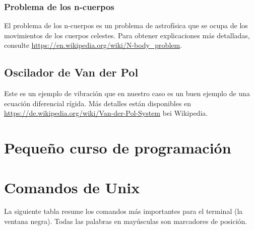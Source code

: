 \subsubsection{Problema de los n-cuerpos }
El problema de los n-cuerpos es un problema de astrofísica que se ocupa de los movimientos de los cuerpos celestes. Para obtener explicaciones más detalladas, consulte \url{https://en.wikipedia.org/wiki/N-body_problem}.

\subsection{Oscilador de Van der Pol }
Este es un ejemplo de vibración que en nuestro caso es un buen ejemplo de una ecuación diferencial rígida. Más detalles están disponibles en \url{https://de.wikipedia.org/wiki/Van-der-Pol-System} bei Wikipedia.




\begin{appendices}

\section{Pequeño curso de programación}

\section{Comandos de Unix }
La siguiente tabla resume los comandos más importantes para el terminal (la ventana negra). Todas las palabras en mayúsculas son marcadores de posición.





\end{appendices}





